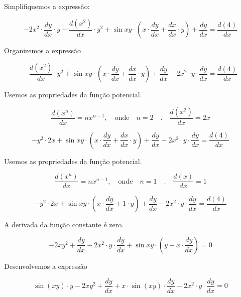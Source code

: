 \documentclass{article}
\begin{document}
Simplifiquemos a expressão:

\[
    -
    2
    x^2
    \cdot
    \frac{dy}{dx}
    \cdot
    y
    -
    \frac{d(x^2)}{dx}
    \cdot
    y^2
    +
    \sin xy
    \cdot
    \left(
    x
    \cdot
    \frac{dy}{dx}
    +
    \frac{dx}{dx}
    \cdot
    y
    \right)
    +
    \frac{dy}{dx}
    =
    \frac{d(4)}{dx}
\]

Organizemos a expressão

\[
    -
    \frac{d(x^2)}{dx}
    \cdot
    y^2
    +
    \sin xy
    \cdot
    \left(
    x
    \cdot
    \frac{dy}{dx}
    +
    \frac{dx}{dx}
    \cdot
    y
    \right)
    +
    \frac{dy}{dx}
    -
    2
    x^2
    \cdot
    y
    \cdot
    \frac{dy}{dx}
    =
    \frac{d(4)}{dx}
\]

Usemos as propriedades da função potencial.

\[
    \frac{d(x^n)}{dx}
    =
    nx^{n-1}
    ,
    \quad
    \text{onde}
    \quad
    n = 2
    \quad
    .
    \quad
    \frac{d(x^2)}{dx} = 2x
\]

\[
    -
    y^2
    \cdot
    2x
    +
    \sin xy
    \cdot
    \left(
    x
    \cdot
    \frac{dy}{dx}
    +
    \frac{dx}{dx}
    \cdot
    y
    \right)
    +
    \frac{dy}{dx}
    -
    2
    x^2
    \cdot
    y
    \cdot
    \frac{dy}{dx}
    =
    \frac{d(4)}{dx}
\]

Usemos as propriedades da função potencial.

\[
    \frac{d(x^n)}{dx}
    =
    nx^{n-1}
    ,
    \quad
    \text{onde}
    \quad
    n = 1
    \quad
    .
    \quad
    \frac{d(x)}{dx} = 1
\]

\[
    -
    y^2
    \cdot
    2x
    +
    \sin xy
    \cdot
    \left(
    x
    \cdot
    \frac{dy}{dx}
    +
    1
    \cdot
    y
    \right)
    +
    \frac{dy}{dx}
    -
    2
    x^2
    \cdot
    y
    \cdot
    \frac{dy}{dx}
    =
    \frac{d(4)}{dx}
\]

A derivada da função constante é zero.

\[
    -
    2
    x
    y^2
    +
    \frac{dy}{dx}
    -
    2
    x^2
    \cdot
    y
    \cdot
    \frac{dy}{dx}
    +
    \sin xy
    \cdot
    \left(
    y
    +
    x
    \cdot
    \frac{dy}{dx}
    \right)
    =
    0
\]

Desenvolvemos a expressão

\[
    \sin(xy) \cdot y
    -
    2
    x
    y^2
    +
    \frac{dy}{dx}
    +
    x \cdot \sin(xy) \cdot \frac{dy}{dx}
    -
    2
    x^2
    \cdot
    y
    \cdot
    \frac{dy}{dx}
    =
    0
\]
\end{document}
